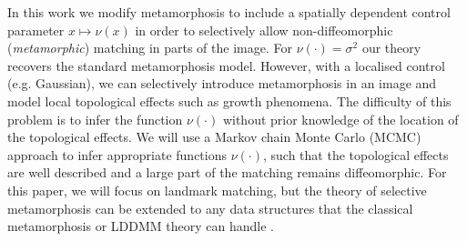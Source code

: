 \documentclass[runningheads]{llncs}
\begin{document}
In this work we modify metamorphosis to include a spatially dependent control
parameter $x\mapsto\nu(x)$ in order to selectively allow non-diffeomorphic
(\emph{metamorphic}) matching in parts of the image. For $\nu(\cdot) = \sigma^2$
our theory recovers the standard metamorphosis model. However, with a localised
control (e.g. Gaussian), we can selectively introduce metamorphosis in an image
and model local topological effects such as growth phenomena. The difficulty of
this problem is to infer the function $\nu(\cdot)$ without prior knowledge of
the location of the topological effects. We will use a Markov chain Monte Carlo
(MCMC) approach to infer appropriate functions $\nu(\cdot)$, such that the
topological effects are well described and a large part of the matching remains
diffeomorphic. For this paper, we will focus on landmark matching, but the
theory of selective metamorphosis can be extended to any data structures that
the classical metamorphosis or LDDMM theory can handle
\cite{bockarnaudoncotter2019}.\\
\end{document}
